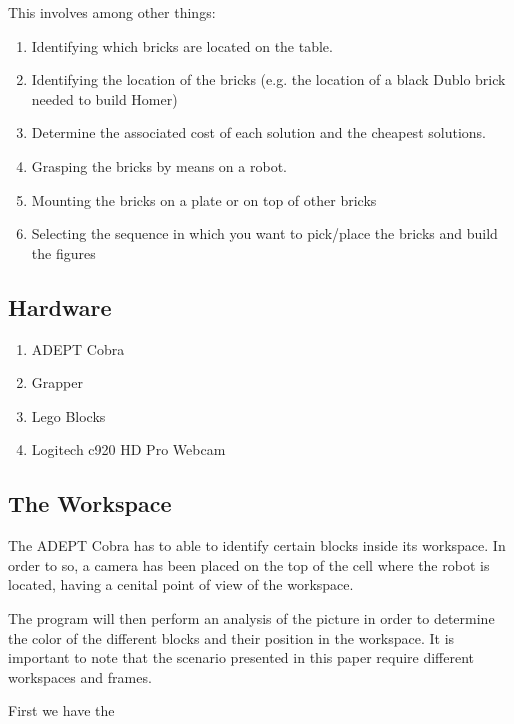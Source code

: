 This involves among other things:
\begin{enumerate}
	\item Identifying which bricks are located on the table.
	\item Identifying the location of the bricks (e.g. the location of a
	black Dublo brick needed to build Homer)
	\item Determine the associated cost of each solution and the
	cheapest solutions.
	\item Grasping the bricks by means on a robot.
	\item Mounting the bricks on a plate or on top of other bricks
	\item Selecting the sequence in which you want to pick/place
	the bricks and build the figures
\end{enumerate}

\subsection*{Hardware}
\begin{enumerate}
	\item ADEPT Cobra
	\item Grapper
	\item Lego Blocks
	\item Logitech c920 HD Pro Webcam
\end{enumerate}

\subsection*{The Workspace} The ADEPT Cobra has to able to identify certain blocks inside its workspace. In order to so, a camera has been placed on the top of the cell where the robot is located, having a cenital point of view of the workspace.

The program will then perform an analysis of the picture in order to determine the color of the different blocks and their position in the workspace.
It is important to note that the scenario presented in this paper require different workspaces and frames.

First we have the 



